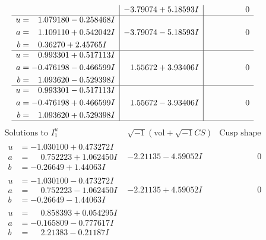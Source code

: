 \documentclass[1p]{elsarticle_modified}
\theoremstyle{definition}
\newcommand{\I}{\sqrt{-1}}
\begin{document}
$$\begin{array}{c|c|c}
 & -3.79074 + 5.18593 I & \phantom{-0.000000 } 0 \\ \hline\begin{aligned}
u &= \phantom{-}1.079180 - 0.258468 I \\
a &= \phantom{-}1.109110 + 0.542042 I \\
b &= \phantom{-}0.36270 + 2.45765 I\end{aligned}
 & -3.79074 - 5.18593 I & \phantom{-0.000000 } 0 \\ \hline\begin{aligned}
u &= \phantom{-}0.993301 + 0.517113 I \\
a &= -0.476198 - 0.466599 I \\
b &= \phantom{-}1.093620 - 0.529398 I\end{aligned}
 & \phantom{-}1.55672 + 3.93406 I & \phantom{-0.000000 } 0 \\ \hline\begin{aligned}
u &= \phantom{-}0.993301 - 0.517113 I \\
a &= -0.476198 + 0.466599 I \\
b &= \phantom{-}1.093620 + 0.529398 I\end{aligned}
 & \phantom{-}1.55672 - 3.93406 I & \phantom{-0.000000 } 0\\
 \hline 
 \end{array}$$\newpage$$\begin{array}{c|c|c}  
\text{Solutions to }I^u_{1}& \I (\text{vol} + \sqrt{-1}CS) & \text{Cusp shape}\\
 \hline 
\begin{aligned}
u &= -1.030100 + 0.473272 I \\
a &= \phantom{-}0.752223 + 1.062450 I \\
b &= -0.26649 + 1.44063 I\end{aligned}
 & -2.21135 - 4.59052 I & \phantom{-0.000000 } 0 \\ \hline\begin{aligned}
u &= -1.030100 - 0.473272 I \\
a &= \phantom{-}0.752223 - 1.062450 I \\
b &= -0.26649 - 1.44063 I\end{aligned}
 & -2.21135 + 4.59052 I & \phantom{-0.000000 } 0 \\ \hline\begin{aligned}
u &= \phantom{-}0.858393 + 0.054295 I \\
a &= -0.165809 - 0.777617 I \\
b &= \phantom{-}2.21383 - 0.21187 I\end{aligned}

\end{array}$$
\end{document}
